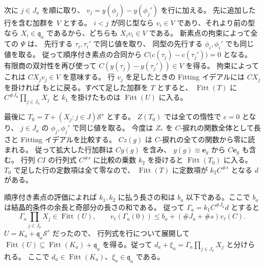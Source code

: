 次に \(j\in J_a\) を順に取り、
\(v_j=y(\phi_j)-y(\phi_j')\) を行に加える。
先に追加した行を含む加群を \(V\) とする。
\(i<j\) が同じ型なら \(v_i\in V\) であり、それより前の型なら
\(X_i\in\mathfrak q_a\) であるから、どちらも \(X_i v_i\in V\) である。
新素点の拘束によって全ての \(\Psi\) は、
先行する \(\tau_i,\tau_i'\) で同じ値を取り、
同型の先行する \(\phi_i,\phi_i'\) でも同じ値を取る。
従って順序付き素点の合同から
\(C\bigl(c(\tau_j)-c(\tau_j')\bigr)=0\) となる。
有限商の双対性を再び使って
\(C(y(\tau_j)-y(\tau_j'))\in V\) を得る。
拘束によってこれは \(CX_jv_j\in V\) を意味する。
行 \(v_j\) を足したときの Fitting イデアルには \(CX_j\) を掛ければ
もとに戻る。すべて足した加群を \(T\) とすると、
\(\operatorname{Fitt}(T)\) に \(C^{\#J_a}\prod_{j\in J_a}X_j\) と
\(k_1\) を掛けたものは \(\operatorname{Fitt}(U)\) に入る。

最後に \(T_0=T+(X_j:j\in J)\mathcal S^s\) とする。
\(Z(T_0)\) では全ての惰性で \(c=0\) となり、
\(j\in J_a\) の \(\phi_j,\phi_j'\) で同じ値を取る。
今度は \(Z_*\) を \(C\)-捩れの関数全体として長さと Fitting イデアルを比較する。
\(Cz(g)\) は \(C\)-捩れの全ての関数から零に読まれる。
従って拡大した行加群は \(C y(g)\) を含み、
\(y(g)\equiv\mathbf e_g\) から \(C\mathbf e_g\) も含む。
行列 \(C I\) の行列式 \(C^{\#s}\) に比較の乗数 \(k_2\) を掛けると
\(\operatorname{Fitt}(T_0)\) に入る。
\(T_0\) で足した行の定数項は全て零なので、
\(\operatorname{Fitt}(T)\) に定数項が \(k_2 C^{\#s}\) となる
\(d\) がある。

順序付き素点の評価によれば \(k_1,k_2\) に払う長さの和は \(b_a\)
以下である。ここで \(b_a\) は結晶的条件の余長と奇部分の長さの和である。
従って \(\Gamma_a=k_1 C^{\#J_a}d\) とすると
\[
 \Gamma_a\prod_{j\in J_a}X_j\in\operatorname{Fitt}(U),\qquad
 v_\ell(\Gamma_a(0))\le b_a+(\#J_a+\#s)v_\ell(C).
\]
\(U=K_a+\mathfrak q_a\mathcal S^s\) だったので、
行列式を行について展開して
\(\operatorname{Fitt}(U)\subseteq\operatorname{Fitt}(K_a)+\mathfrak q_a\)
を得る。従って
\(d_a+\xi_a=\Gamma_a\prod_{j\in J_a}X_j\) と分けられる。
ここで \(d_a\in\operatorname{Fitt}(K_a)\)、\(\xi_a\in\mathfrak q_a\) である。

